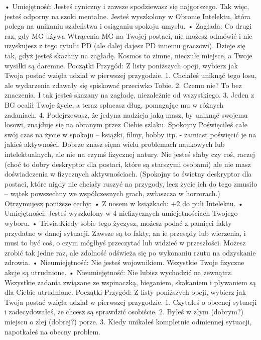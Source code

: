     • Umiejętność: Jesteś cyniczny i zawsze spodziewasz się najgorszego. Tak więc, jesteś odporny na szoki mentalne. Jesteś wyszkolony w Obronie Intelektu, która polega na unikaniu szaleństwa i osiąganiu spokoju umysłu.
    • Zagłada: Co drugi raz, gdy MG używa Wtrącenia MG na Twojej postaci, nie możesz odmówić i nie uzyskujesz z tego tytułu PD (ale dalej dajesz PD innemu graczowi). Dzieje się tak, gdyż jesteś skazany na zagładę. Kosmos to zimne, nieczułe miejsce, a Twoje wysiłki są daremne.
Początki Przygód: Z listy poniższych opcji, wybierz jak Twoja postać wzięła udział w pierwszej przygodzie.
1. Chciałeś uniknąć tego losu, ale wydarzenia zdawały się spiskować przeciwko Tobie.
2. Czemu nie? To bez znaczenia. I tak jesteś skazany na zagładę, niezależnie od wszystkiego.
3. Jeden z BG ocalił Twoje życie, a teraz spłacasz dług, pomagając mu w różnych zadaniach.
4. Podejrzewasz, że jedyna nadzieja jaką masz, by uniknąć swojemu losowi, znajduje się na obranym przez Ciebie szlaku.
Spokojny
Poświęciłeś całe swój czas na życie w spokoju – książki, filmy, hobby itp. - zamiast poświęcić je na jakieś aktywności. Dobrze znasz sięna wielu problemach naukowych lub intelektualnych, ale nie na czymś fizycznej natury. Nie jesteś słaby czy coś, raczej (choć to dobry deskryptor dla postaci, które są starszymi osobami) ale nie masz doświadczenia w fizycznych aktywnościach.
(Spokojny to świetny deskryptor dla postaci, które nigdy nie chciały ruszyć na przygody, lecz życie ich do tego zmusiło – wątek powszechny we współczesnych grach, zwłaszcza w horrorach.)
Otrzymujesz poniższe cechy:
    • Z nosem w książkach: +2 do puli Intelektu.
    • Umiejętności: Jesteś wyszkolony w 4 niefizycznych umiejętnościach Twojego wyboru.
    • Trivia:Kiedy sobie tego życzysz, możesz podać z pamięci fakty przydatne w danej sytuacji. Zawsze są to fakty, an ie przesądy lub wierzenia, i musi to być coś, o czym mógłbyś przeczytać lub widzieć w przeszłości. Możesz zrobić tak jedne raz, ale zdolność odświeża się po wykonaniu rzutu na odzyskanie zdrowia.
    • Nieumiejętność: Nie jesteś wojownikiem. Wszystkie Twoje fizyczne akcje są utrudnione. 
    • Nieumiejętność: Nie lubisz wychodzić na zewnątrz. Wszystkie zadania związane ze wspinaczką, bieganiem, skakaniem i pływaniem są dla Ciebie utrudnione.
Początki Przygód: Z listy poniższych opcji, wybierz jak Twoja postać wzięła udział w pierwszej przygodzie.
1. Czytałeś o obecnej sytuacji i zadecydowałeś, że chcesz są sprawdzić osobiście.
2. Byłeś w złym (dobrym?) miejscu o złej (dobrej?) porze.
3. Kiedy unikałeś kompletnie odmiennej sytuacji, napotkałeś na obecny problem.
